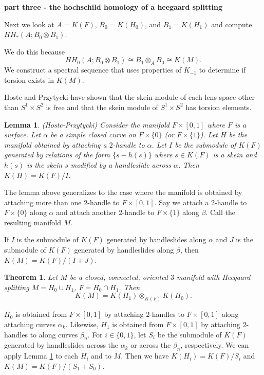 \documentclass{slides}
\newcommand{\ot}{\otimes}
\newtheorem{lemma}{Lemma}
\newtheorem{theorem}{Theorem}
\begin{document}
\begin{slide}
\textbf{part three - the hochschild homology of a heegaard splitting}

Next we look at $A=K(F)$, $B_0=K(H_0)$,
and $B_1=K(H_1)$ and compute
$HH_{*}(A; B_0 \ot B_1)$.

We do this because
$$HH_0(A; B_0 \ot B_1) \cong B_1 \ot_{A} B_0 \cong K(M).$$
We construct a spectral sequence that uses properties of $K_{-1}$ to determine
if torsion exists in $K(M)$.

Hoste and Przytycki have shown that
the skein module of each lens space other than $S^1 \times S^2$ is free
and that the skein module of $S^1 \times S^2$ has torsion
elements.
\end{slide}

\begin{slide}
\begin{lemma}(Hoste-Przytycki)
Consider the manifold $F \times [0,1]$ where $F$ is a surface.
Let $\alpha$ be a simple closed curve on $F \times \{ 0 \}$ (or $F \times \{ 1 \}$).
Let $H$ be the manifold obtained by attaching a $2$-handle to $\alpha$.
Let $I$ be the submodule of $K(F)$ generated by relations of the form
$\{ s - h(s) \}$ where $s \in K(F)$ is a skein and $h(s)$ is the skein $s$
modified by a handleslide across $\alpha$.  Then $K(H) = K(F)/I$.
\label{handleslide}
\end{lemma}

The lemma above generalizes to the case where the manifold is obtained by
attaching more than one $2$-handle to $F \times [0,1]$.  Say we attach
a $2$-handle to $F \times \{ 0 \}$ along $\alpha$ and attach another
$2$-handle to $F \times \{ 1 \}$ along $\beta$.  Call the resulting
manifold $M$.

If $I$ is the submodule
of $K(F)$ generated by handleslides along $\alpha$ and $J$ is the submodule
of $K(F)$ generated by handleslides along $\beta$, then
$K(M) = K(F)/(I+J)$.
\end{slide}

\begin{slide}
\begin{theorem}
Let $M$ be a closed, connected, oriented $3$-manifold with Heegaard splitting
$M= H_0 \cup H_1$, $F = H_0 \cap H_1$.  Then
$$K(M) = K(H_1) \ot_{K(F)} K(H_0).$$
\label{kmhs}
\end{theorem}

\proof
$H_0$ is obtained from
$F \times [0,1]$ by attaching $2$-handles to $F \times [0,1]$
along attaching curves $\alpha_k$.  Likewise, $H_1$ is obtained
from $F \times [0,1]$ by attaching $2$-handles to along curves $\beta_n$.
For $i \in \{0,1\}$, let $S_i$ be the submodule of $K(F)$
generated by handleslides across the $\alpha_k$ or across the $\beta_n$, respectively.
We can apply Lemma \ref{handleslide} to each $H_i$ and to $M$.  Then
we have $K(H_i) = K(F)/S_i$ and $K(M) = K(F)/(S_1 + S_0)$.
\end{slide}
\end{document}
